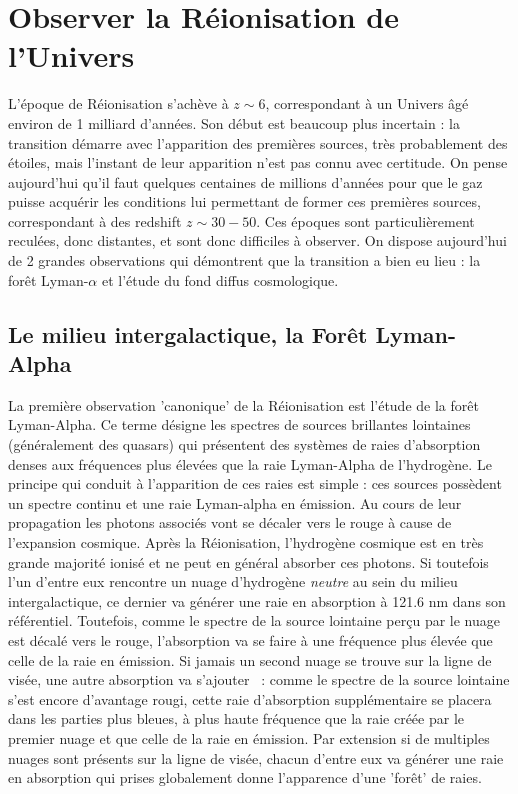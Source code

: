 \section{Observer la Réionisation de l'Univers}
L'époque de Réionisation s'achève à $z\sim 6$, correspondant à un Univers âgé environ de 1 milliard d'années. Son début est beaucoup plus incertain : la transition démarre avec l'apparition des premières sources, très probablement des étoiles, mais l'instant de leur apparition n'est pas connu avec certitude. On pense aujourd'hui qu'il faut quelques centaines de millions d'années pour que le gaz puisse acquérir les conditions lui permettant de former ces premières sources, correspondant à des redshift $z\sim 30- 50$. Ces époques sont particulièrement reculées, donc distantes, et sont donc difficiles à observer.  On dispose aujourd'hui de 2 grandes observations qui démontrent que la transition a bien eu lieu : la forêt Lyman-$\alpha$ et l'étude du fond diffus cosmologique.

\subsection{Le milieu intergalactique, la Forêt Lyman-Alpha}
La première observation 'canonique' de la Réionisation est l'étude de la forêt Lyman-Alpha. Ce terme désigne les spectres de sources brillantes lointaines (généralement des quasars) qui présentent des systèmes de raies d'absorption denses aux fréquences plus élevées que la raie Lyman-Alpha de l'hydrogène. Le principe qui conduit à l'apparition de ces raies est simple : ces sources possèdent un spectre continu et une raie Lyman-alpha en émission. Au cours de leur propagation les photons associés vont se décaler vers le rouge à cause de l'expansion cosmique. Après la Réionisation, l'hydrogène cosmique est en très grande majorité ionisé et ne peut en général absorber ces photons. Si toutefois l'un d'entre eux rencontre un nuage d'hydrogène \textit{neutre} au sein du milieu intergalactique, ce dernier va générer une raie en absorption à 121.6 nm dans son référentiel. Toutefois, comme le spectre de la source lointaine perçu par le nuage est décalé vers le rouge, l'absorption va se faire à une fréquence plus élevée que celle de la raie en émission. Si jamais un second nuage se trouve sur la ligne de visée, une autre absorption va s'ajouter ~: comme le spectre de la source lointaine s'est encore d'avantage rougi, cette raie d'absorption supplémentaire se placera dans les parties plus bleues, à plus haute fréquence que la raie créée par le premier nuage et que celle de la raie en émission. Par extension si de multiples nuages sont présents sur la ligne de visée, chacun d'entre eux va générer une raie en absorption qui prises globalement donne l'apparence d'une 'forêt' de raies.

